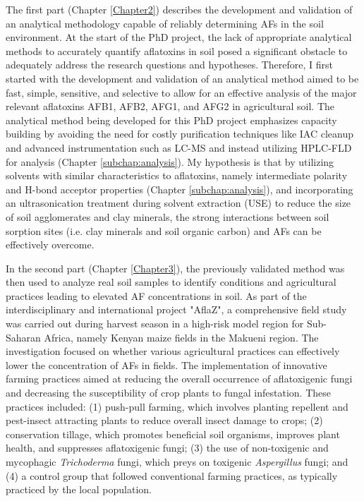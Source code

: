 The first part (Chapter \ref{Chapter2}) describes the development and validation of an analytical methodology capable of reliably determining AFs in the soil environment. At the start of the PhD project, the lack of appropriate analytical methods to accurately quantify aflatoxins in soil posed a significant obstacle to adequately address the research questions and hypotheses. Therefore, I first started with the development and validation of an analytical method aimed to be fast, simple, sensitive, and selective to allow for an effective analysis of the major relevant aflatoxins AFB1, AFB2, AFG1, and AFG2 in agricultural soil. The analytical method being developed for this PhD project emphasizes capacity building by avoiding the need for costly purification techniques like IAC cleanup and advanced instrumentation such as LC-MS and instead utilizing HPLC-FLD for analysis (Chapter \ref{subchap:analysis}). My hypothesis is that by utilizing solvents with similar characteristics to aflatoxins, namely intermediate polarity and H-bond acceptor properties (Chapter \ref{subchap:analysis}), and incorporating an ultrasonication treatment during solvent extraction (USE) to reduce the size of soil agglomerates and clay minerals, the strong interactions between soil sorption sites (i.e. clay minerals and soil organic carbon) and AFs can be effectively overcome.


In the second part (Chapter \ref{Chapter3}), the previously validated method was then used to analyze real soil samples to identify conditions and agricultural practices leading to elevated AF concentrations in soil. As part of the interdisciplinary and international project "AflaZ", a comprehensive field study was carried out during harvest season in a high-risk model region for Sub-Saharan Africa, namely Kenyan maize fields in the Makueni region. The investigation focused on whether various agricultural practices can effectively lower the concentration of AFs in fields. The implementation of innovative farming practices aimed at reducing the overall occurrence of aflatoxigenic fungi and decreasing the susceptibility of crop plants to fungal infestation. These practices included: (1) push-pull farming, which involves planting repellent and pest-insect attracting plants to reduce overall insect damage to crops; (2) conservation tillage, which promotes beneficial soil organisms, improves plant health, and suppresses aflatoxigenic fungi; (3) the use of non-toxigenic and mycophagic \textit{Trichoderma} fungi, which preys on toxigenic \textit{Aspergillus} fungi; and (4) a control group that followed conventional farming practices, as typically practiced by the local population.


